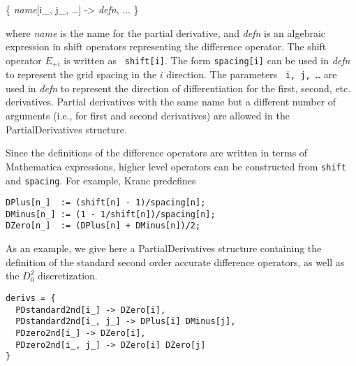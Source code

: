 \documentclass{report}
\begin{document}
\begin{center}
\begin{minipage}{0.8 \textwidth}
\begin{tt}
\{  {\it name}[i\_, j\_, \ldots] -> {\it defn}, ...  \}
\end{tt}
\end{minipage}
\end{center}

where {\it name} is the name for the partial derivative, and {\it
defn} is an algebraic expression in shift operators representing the
difference operator.  The shift operator $E_{+i}$ is written as {\tt
shift[i]}.  The form {\tt spacing[i]} can be used in {\it defn} to
represent the grid spacing in the $i$ direction.  The parameters {\tt
i, j, \ldots} are used in {\it defn} to represent the direction of
differentiation for the first, second, etc.  derivatives.  Partial
derivatives with the same name but a different number of arguments
(i.e., for first and second derivatives) are allowed in the
PartialDerivatives structure.

Since the definitions of the difference operators are written in terms
of Mathematica expressions, higher level operators can be constructed
from {\tt shift} and {\tt spacing}.  For example, Kranc predefines

\begin{center}
\begin{minipage}{0.8 \textwidth}
\begin{verbatim}
DPlus[n_]  := (shift[n] - 1)/spacing[n];
DMinus[n_] := (1 - 1/shift[n])/spacing[n];
DZero[n_]  := (DPlus[n] + DMinus[n])/2;
\end{verbatim}
\end{minipage}
\end{center}

As an example, we give here a PartialDerivatives structure containing
the definition of the standard second order accurate difference
operators, as well as the $D_0^2$ discretization.

\begin{center}
\begin{minipage}{0.8 \textwidth}
\begin{verbatim}
derivs = {
  PDstandard2nd[i_] -> DZero[i],
  PDstandard2nd[i_, j_] -> DPlus[i] DMinus[j],
  PDzero2nd[i_] -> DZero[i],
  PDzero2nd[i_, j_] -> DZero[i] DZero[j]
}
\end{verbatim}
\end{minipage}
\end{center}
\end{document}
